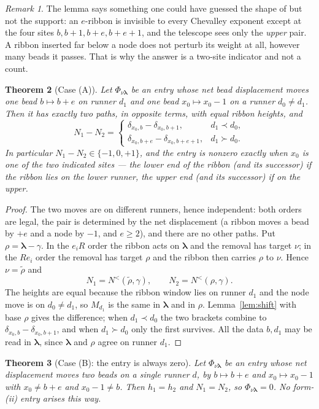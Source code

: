 \documentclass[11pt]{article}
\newtheorem{theorem}{Theorem}[section]
\theoremstyle{definition}
\theoremstyle{remark}
\newtheorem{remark}[theorem]{Remark}
\newcommand{\bl}{\boldsymbol{\lambda}}
\newcommand{\Nlt}{N^{<}}
\begin{document}
\begin{remark}
The lemma says something one could have guessed the shape of but not the support: an
$e$-ribbon is invisible to every Chevalley exponent except at the four sites
$b,b+1,b+e,b+e+1$, and the telescope sees only the \emph{upper} pair. A ribbon inserted
far below a node does not perturb its weight at all, however many beads it passes. That
is why the answer is a two-site indicator and not a count.
\end{remark}

\begin{theorem}[Case (A)]\label{thm:A}
Let $\Phi_{\nu\bl}$ be an entry whose net bead displacement moves one bead $b\mapsto b+e$
on runner $d_1$ and one bead $x_0\mapsto x_0-1$ on a runner $d_0\ne d_1$. Then it has
exactly two paths, in opposite terms, with equal ribbon heights, and
\[
N_1-N_2=\begin{cases}
\delta_{x_0,b}-\delta_{x_0,b+1}, & d_1\prec d_0,\\[2pt]
\delta_{x_0,b+e}-\delta_{x_0,b+e+1}, & d_1\succ d_0.
\end{cases}
\]
In particular $N_1-N_2\in\{-1,0,+1\}$, and the entry is nonzero exactly when $x_0$ is
one of the two indicated sites --- the lower end of the ribbon (and its successor) if the
ribbon lies on the lower runner, the upper end (and its successor) if on the upper.
\end{theorem}

\begin{proof}
The two moves are on different runners, hence independent: both orders are legal, the
pair is determined by the net displacement (a ribbon moves a bead by $+e$ and a node by
$-1$, and $e\ge2$), and there are no other paths. Put $\rho=\bl-\gamma$. In the $e_iR$
order the ribbon acts on $\bl$ and the removal has target $\nu$; in the $Re_i$ order the
removal has target $\rho$ and the ribbon then carries $\rho$ to $\nu$. Hence
$\nu=\tilde\rho$ and
\[
N_1=\Nlt(\tilde\rho,\gamma),\qquad N_2=\Nlt(\rho,\gamma).
\]
The heights are equal because the ribbon window lies on runner $d_1$ and the node move
is on $d_0\ne d_1$, so $M_{d_1}$ is the same in $\bl$ and in $\rho$. Lemma~\ref{lem:shift}
with base $\rho$ gives the difference; when $d_1\prec d_0$ the two brackets combine to
$\delta_{x_0,b}-\delta_{x_0,b+1}$, and when $d_1\succ d_0$ only the first survives. All
the data $b,d_1$ may be read in $\bl$, since $\bl$ and $\rho$ agree on runner $d_1$.
\end{proof}

\begin{theorem}[Case (B): the entry is always zero]\label{thm:B}
Let $\Phi_{\nu\bl}$ be an entry whose net displacement moves two beads on a single runner
$d$, by $b\mapsto b+e$ and $x_0\mapsto x_0-1$ with $x_0\ne b+e$ and $x_0-1\ne b$. Then
$h_1=h_2$ and $N_1=N_2$, so $\Phi_{\nu\bl}=0$. No form-(ii) entry arises this way.
\end{theorem}
\end{document}
